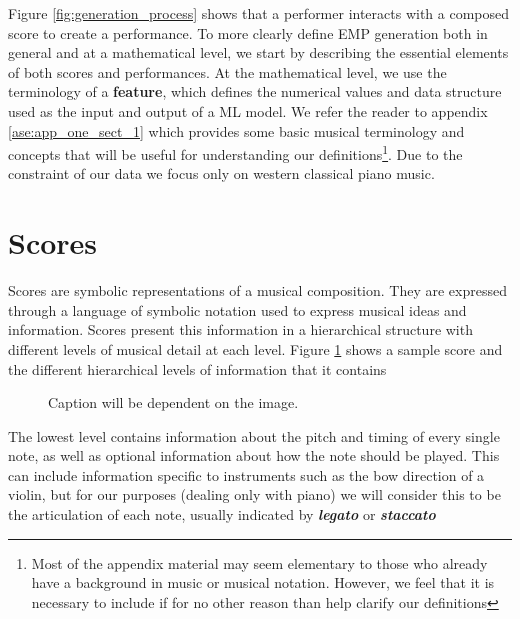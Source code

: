 Figure \ref{fig:generation_process} shows that a performer interacts with a composed score to create a performance. To more clearly define EMP generation both in general and at a mathematical level, we start by describing the essential elements of both scores and performances. At the mathematical level, we use the terminology of a \textbf{feature}, which defines the numerical values and data structure used as the input and output of a ML model. We refer the reader to appendix \ref{ase:app_one_sect_1} which provides some basic musical terminology and concepts that will be useful for understanding our definitions\footnote{Most of the appendix material may seem elementary to those who already have a background in music or musical notation. However, we feel that it is necessary to include if for no other reason than help clarify our definitions}. Due to the constraint of our data  we focus only on western classical piano music. 

\section{Scores}\label{sec:scores}
Scores are symbolic representations of a musical composition. They are expressed through a language of symbolic notation used to express musical ideas and information. Scores present this information in a hierarchical structure with different levels of musical detail at each level. Figure \ref{fig:score_hierarchy} shows a sample score and the different hierarchical levels of information that it contains

\begin{figure}
    \centering
    \caption{Caption will be dependent on the image.}
    \label{fig:score_hierarchy}
\end{figure}

\newcommand{\mnot}[1]{\textbf{\emph{#1}}}

The lowest level contains information about the pitch and timing of every single note, as well as optional information about how the note should be played. This can include information specific to instruments such as the bow direction of a violin, but for our purposes (dealing only with piano) we will consider this to be the articulation of each note, usually indicated by \mnot{legato} or \mnot{staccato} 

